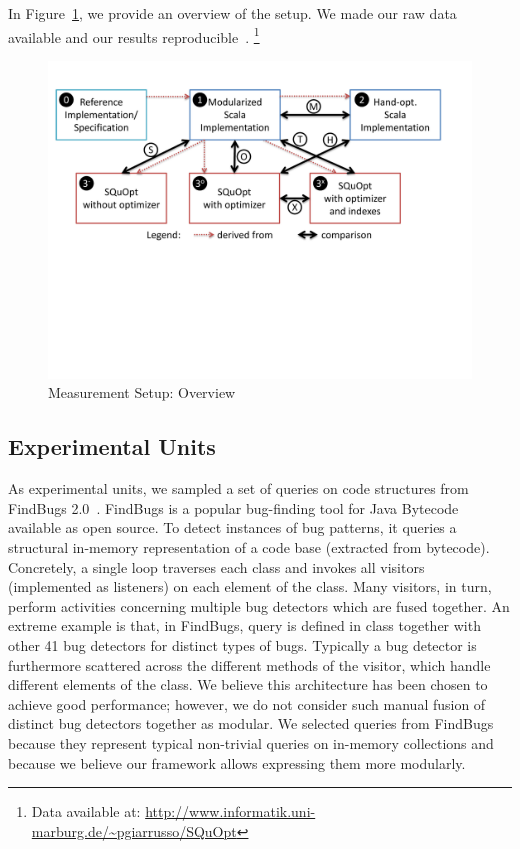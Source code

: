 In Figure~\ref{fig:measurements-overview}, we provide an overview of the setup.
	We made our raw data available and our results reproducible~\citep{Vitek11R3}.%
\footnote{Data available at: \url{http://www.informatik.uni-marburg.de/~pgiarrusso/SQuOpt}}

\begin{figure}
	\centering
		\includegraphics[width=\linewidth]{aosd13/graphs/measurements-overview}
	\caption{Measurement Setup: Overview}
	\label{fig:measurements-overview}
\end{figure}


\subsection{Experimental Units}




As experimental units, we sampled a set of queries on code structures from FindBugs 2.0~\citep{DBLP:journals/sigplan/HovemeyerP04}. FindBugs is a popular bug-finding tool for Java Bytecode available as open source. To detect instances of bug patterns, it queries a structural in-memory representation of a code base (extracted from bytecode).
Concretely, a single loop traverses each class and invokes all visitors (implemented as listeners) on each element of the class. Many visitors, in turn, perform activities concerning multiple bug detectors which are fused together. An extreme example is that, in FindBugs, query \queryRUNFINALIZERSONEXIT{} is defined in class  together with other 41 bug detectors for distinct types of bugs.
Typically a bug detector is furthermore scattered across the different methods of the visitor, which handle different elements of the class.
We believe this architecture has been chosen to achieve good performance; however, we do not consider such manual fusion of distinct bug detectors together as modular. We selected queries from FindBugs because they represent typical non-trivial queries on in-memory collections and because we believe our framework allows expressing them more modularly.

